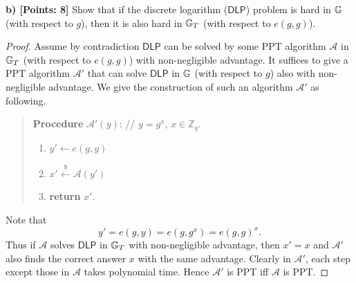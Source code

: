 \documentclass[12pt]{article}
\newcommand{\Z}{\mathbb{Z}}
\newcommand{\getsr}{\stackrel{\$}{\gets}}
\theoremstyle{definition}
\newcommand{\A}{\mathcal{A}}
\begin{document}
\newcommand{\DLP}{\textsf{DLP}}
{\bf b) [Points: 8]} Show that if the discrete logarithm ($\DLP$) problem is hard in $\mathbb{G}$ (with respect to $g$), then it is also hard in $\mathbb{G}_T$ (with respect to $e(g,g)$).
\begin{proof}
Assume by contradiction $\DLP$ can be solved by some PPT algorithm $\A$ in $\mathbb{G}_T$ (with respect to $e(g,g)$) with non-negligible advantage. It suffices to give a PPT algorithm $\A'$ that can solve $\DLP$ in $\mathbb{G}$ (with respect to $g$) also with non-negligible advantage. We give the construction of such an algorithm $\A'$ as following.
\begin{quote}
{\bf Procedure} $\A'(y)$: // $y = g^x$, $x\in\Z_q$.
\begin{enumerate}
\item $y' \gets e(g,y)$
\item $x' \getsr \A(y')$
\item {\bf return} $x'$.
\end{enumerate}
\end{quote}
Note that 
$$y' = e(g,y) = e(g, g^x) = e(g,g)^x.$$
Thus if $\A$ solves $\DLP$ in $\mathbb{G}_T$ with non-negligible advantage, then $x'=x$ and $\A'$ also finds the correct answer $x$ with the same advantage. Clearly in $\A'$, each step except those in $\A$ takes polynomial time. Hence $\A'$ is PPT iff $\A$ is PPT. 
\end{proof}
\end{document}
